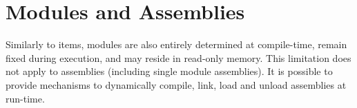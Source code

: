 \chapter{Modules and Assemblies}

Similarly to items, modules are also entirely determined at compile-time, remain fixed during execution, and may reside in read-only memory. This limitation does not apply to assemblies (including single module assemblies). It is possible to provide mechanisms to dynamically compile, link, load and unload assemblies at run-time.
